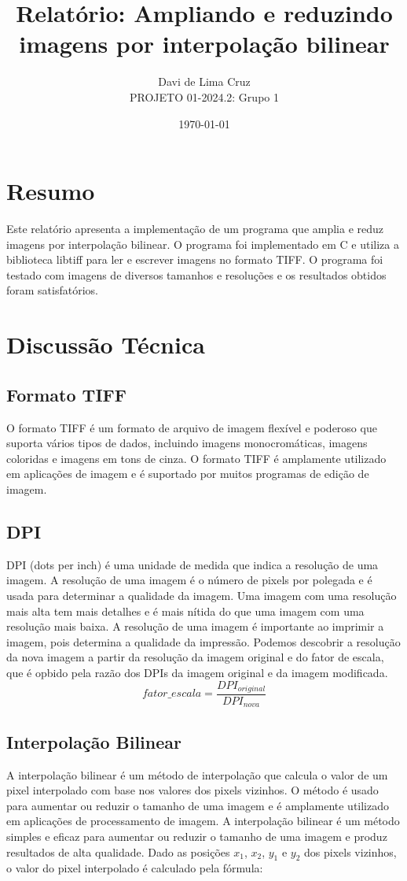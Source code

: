 \documentclass{article}
\author{Davi de Lima Cruz\\  PROJETO 01-2024.2: Grupo 1}
\title{Relatório: Ampliando e reduzindo imagens por interpolação bilinear}
\date{\today}
\begin{document}
\maketitle

\vfill
\section*{Resumo}
    Este relatório apresenta a implementação de um programa que amplia e reduz imagens por interpolação bilinear. O programa foi implementado em C e utiliza a biblioteca libtiff para ler e escrever imagens no formato TIFF.
     O programa foi testado com imagens de diversos tamanhos e resoluções e os resultados obtidos foram satisfatórios.


\newpage
\section{Discussão Técnica}
\subsection{Formato TIFF}
O formato TIFF é um formato de arquivo de imagem flexível e poderoso que suporta vários tipos de dados,
 incluindo imagens monocromáticas, imagens coloridas e imagens em tons de cinza.
  O formato TIFF é amplamente utilizado em aplicações de imagem e é suportado por muitos programas de edição de imagem.

\subsection{DPI}
DPI (dots per inch) é uma unidade de medida que indica a resolução de uma imagem.
 A resolução de uma imagem é o número de pixels por polegada e é usada para determinar a qualidade da imagem.
  Uma imagem com uma resolução mais alta tem mais detalhes e é mais nítida do que uma imagem com uma resolução mais baixa.
   A resolução de uma imagem é importante ao imprimir a imagem, pois determina a qualidade da impressão.
   Podemos descobrir a resolução da nova imagem a partir da resolução da imagem original e do fator de escala, que é opbido pela razão dos DPIs da imagem original e da imagem modificada.
   \begin{equation}
    fator\_escala  = \frac{DPI_{original}}{DPI_{nova}}
   \end{equation}
\subsection{Interpolação Bilinear}
A interpolação bilinear é um método de interpolação que calcula o valor de um pixel interpolado com base nos valores dos pixels vizinhos.
 O método é usado para aumentar ou reduzir o tamanho de uma imagem e é amplamente utilizado em aplicações de processamento de imagem.
A interpolação bilinear é um método simples e eficaz para aumentar ou reduzir o tamanho de uma imagem e produz resultados de alta qualidade.
    Dado as posições $x_1$, $x_2$, $y_1$ e $y_2$ dos pixels vizinhos, o valor do pixel interpolado é calculado pela fórmula:
\end{document}
